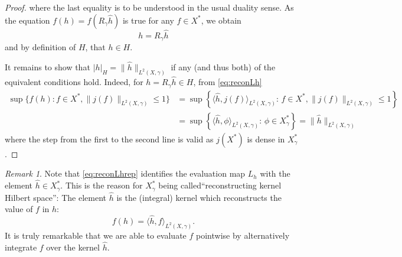 \documentclass{scrartcl}
\theoremstyle{definition}
\theoremstyle{remark}
\newtheorem{remark}{Remark}
\begin{document}
\begin{proof}
where the last equality is to be understood in the usual duality sense. As the equation $f(h) = f(R_\gamma \hat h)$ is true for any $f\in X^*$, we obtain 
\[ h = R_\gamma\hat h \]
and by definition of $H$, that $h\in H$.

It remains to show that $|h|_H = \|\hat h\|_{L^2(X,\gamma)}$ if any (and thus both) of the equivalent conditions hold. Indeed, for $h = R_\gamma \hat h \in H$, from \eqref{eq:reconLh}
\begin{align*}
\sup\{f(h): f\in X^*, \|j(f)\|_{L^2(X,\gamma)}\leq 1\} &= \sup\left\{\langle \hat h, j(f) \rangle_{L^2(X,\gamma)}:\, f\in X^*, \|j(f)\|_{L^2(X,\gamma)}\leq 1\right\}\\
&= \sup\left\{\langle \hat h, \phi\rangle_{L^2(X,\gamma)}:\, \phi\in X_\gamma^*\right\} = \|\hat h\|_{L^2(X, \gamma)}
\end{align*}
where the step from the first to the second line is valid as $j(X^*)$ is dense in $X_\gamma^*$.
\end{proof}
\begin{remark}\label{rem:RKHS}
Note that \eqref{eq:reconLhrep} identifies the evaluation map $L_h$ with the element $\hat h \in X_\gamma^*$. This is the reason for $X_\gamma^*$ being called``reconstructing kernel Hilbert space'': The element $\hat h$ is the (integral) kernel which reconstructs the value of $f$ in $h$:
\[ f(h) = \langle \hat h, f\rangle_{L^2(X,\gamma)}.\]
It is truly remarkable that we are able to evaluate $f$ pointwise by alternatively integrate $f$ over the kernel $\hat h$.
\end{remark}
\end{document}
